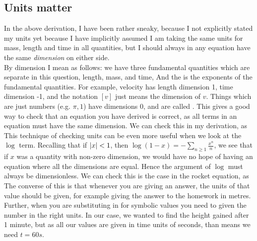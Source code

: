 \documentclass{article}
\begin{document}
\subsection{Units matter}
In the above derivation, I have been rather sneaky, because I not explicitly stated my units yet because I have implicitly assumed I am taking the same units for mass, length and time in all quantities, but I should always in any equation have the same \emph{dimension} on either side. \\
By dimension I mean as follows: we have three fundamental quantities which are separate in this question, length, mass, and time, 
And the  is the exponents of the fundamental quantities. For example, velocity has length dimension 1, time dimension -1, and the notation $[v]$ just means the dimension of $v$.  Things which are just numbers (e.g. $\pi,1$) have dimensions 0, and are called .  This gives a good way to check that an equation you have derived is correct, as all terms in an equation must have the same dimension. We can check this in my derivation, as 
This technique of checking units can be even more useful when we look at the $\log$ term. Recalling that if $\left\lvert x \right\rvert<1$, then $\log(1-x) =-\sum_{n \geq 1} \frac{x^n}{n}$, we see that if $x$ was a quantity with non-zero dimension, we would have no hope of having an equation where all the dimensions are equal. Hence the argument of $\log$ must always be dimensionless. We can check this is the case in the rocket equation, as 
The converse of this is that whenever you are giving an answer, the units of that value should be given, for example giving the answer to the homework in metres. Further, when you are substituting in for symbolic values you need to given the number in the right units. In our case, we wanted to find the height gained after 1 minute, but as all our values are given in time units of seconds, than means we need $t=60s$.
\end{document}
